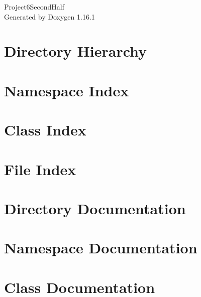 \documentclass[twoside]{book}
\newcommand{\+}{\discretionary{\mbox{\scriptsize$\hookleftarrow$}}{}{}}
\newcommand{\clearemptydoublepage}{%
    \newpage{\pagestyle{empty}\cleardoublepage}%
  }
\begin{document}
  \raggedbottom
    \hypersetup{pageanchor=false,
                bookmarksnumbered=true,
                pdfencoding=unicode
               }
  \begin{titlepage}
  \vspace*{7cm}
  \begin{center}%
  {\Large Project6\+Second\+Half}\\
  \vspace*{1cm}
  {\large Generated by Doxygen 1.16.1}\\
  \end{center}
  \end{titlepage}
  \clearemptydoublepage
  \tableofcontents
  \clearemptydoublepage
  \hypersetup{pageanchor=true}
\chapter{Directory Hierarchy}

\chapter{Namespace Index}

\chapter{Class Index}

\chapter{File Index}

\chapter{Directory Documentation}



\chapter{Namespace Documentation}

\chapter{Class Documentation}






\end{document}
